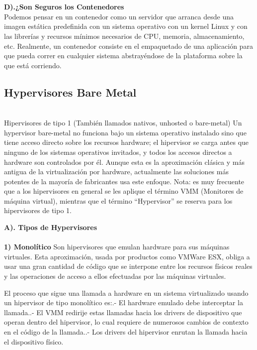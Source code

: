 \documentclass[twoside,twocolumn]{article}
\begin{document}
\begin{flushright}
\begin{itemize}
\textbf{}\\
\textbf{}\\
 \textbf{D).¿Son Seguros los Contenedores}\\
\textbf{}Podemos pensar en un contenedor como un servidor que arranca desde una imagen estática predefinida con un sistema operativo con un kernel Linux y con las librerías y recursos mínimos necesarios de CPU, memoria, almacenamiento, etc. Realmente, un contenedor consiste en el empaquetado de una aplicación para que pueda correr en cualquier sistema abstrayéndose de la plataforma sobre la que está corriendo.\\



\subsection{Hypervisores Bare Metal}
\textbf{}\\
Hipervisores de tipo 1 (También llamados nativos, unhosted o bare-metal)
Un hypervisor bare-metal no funciona bajo un sistema operativo instalado sino que tiene acceso directo sobre los recursos hardware; el hipervisor se carga antes que ninguno de los sistemas operativos invitados, y todos los accesos directos a hardware son controlados por él.
Aunque esta es la aproximación clásica y más antigua de la virtualización por hardware, actualmente las soluciones más potentes de la mayoría de fabricantes usa este enfoque.
Nota: es muy frecuente que a los hipervisores en general se les aplique el término VMM (Monitores de máquina virtual), mientras que el término “Hypervisor” se reserva para los hipervisores de tipo 1.


 \textbf{A). Tipos de Hypervisores }\\
\textbf{}\\

\textbf{1) Monolítico}\newline
Son hipervisores que emulan hardware para sus máquinas virtuales.
Esta aproximación, usada por productos como VMWare ESX, obliga a usar una gran cantidad de código que se interpone entre los recursos físicos reales y las operaciones de acceso a ellos efectuadas por las máquinas virtuales.\newline

El proceso que sigue una llamada a hardware en un sistema virtualizado usando un hipervisor de tipo monolítico es:.- El hardware emulado debe interceptar la llamada..- El VMM redirije estas llamadas hacia los drivers de dispositivo que operan dentro del hipervisor, lo cual requiere de numerosos cambios de contexto en el código de la llamada..- Los drivers del hipervisor enrutan la llamada hacia el dispositivo físico.\newline
    


\end{itemize}
\end{flushright}
\end{document}
